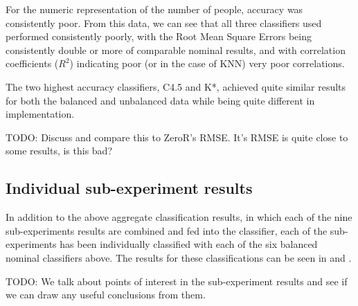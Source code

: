 \documentclass[../thesis/thesis.tex]{subfiles}
\begin{document}
For the numeric representation of the number of people, accuracy was consistently poor. From this data, we can see that all three classifiers used performed consistently poorly, with the Root Mean Square Errors being consistently double or more of comparable nominal results, and with correlation coefficients ($R^2$) indicating poor (or in the case of KNN) very poor correlations.

The two highest accuracy classifiers, C4.5 and K*, achieved quite similar results for both the balanced and unbalanced data while being quite different in implementation. %

TODO: Discuss and compare this to ZeroR's RMSE. It's RMSE is quite close to some results, is this bad?

\subsection{Individual sub-experiment results}

In addition to the above aggregate classification results, in which each of the nine sub-experiments results are combined and fed into the classifier, each of the sub-experiments has been individually classified with each of the six balanced nominal classifiers above. The results for these classifications can be seen in  and .

TODO: We talk about points of interest in the sub-experiment results and see if we can draw any useful conclusions from them.
\end{document}
